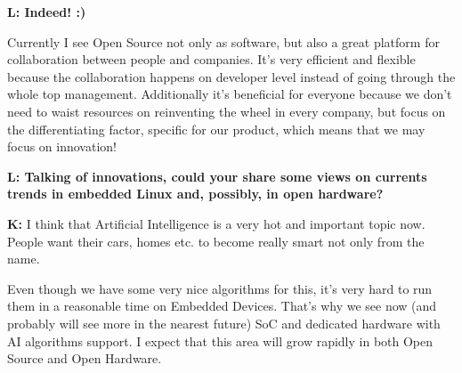 \documentclass[10pt, a5paper]{article}
\begin{document}
\begin{Parallel}[p]{}{}
{{\noindent \bf L: Indeed! :)}

Currently I see Open Source not only as software, but also a great platform for collaboration between people and companies.
It's very efficient and flexible because the collaboration happens on developer level instead of going through the whole top management.
Additionally it's beneficial for everyone because we don't need to waist resources on reinventing the wheel in every company, but focus on the differentiating factor, specific for our product, which means that we may focus on innovation!

{\noindent \bf L: Talking of innovations, could your share some views on currents trends in embedded Linux and, possibly, in open hardware?}

{\noindent \bf K:} I think that Artificial Intelligence is a very hot and important topic now.
People want their cars, homes etc. to become really smart not only from the name.

Even though we have some very nice algorithms for this, it's very hard to run them in a reasonable time on Embedded Devices.
That's why we see now (and probably will see more in the nearest future) SoC and dedicated hardware with AI algorithms support.
I expect that this area will grow rapidly in both Open Source and Open Hardware.


\vfill
     }
\end{Parallel}
\end{document}
